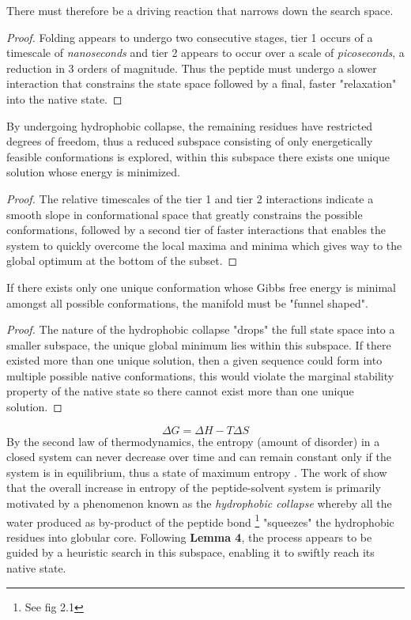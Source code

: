 \begin{lemma}
    There must therefore be a driving reaction that narrows down the search space.
\end{lemma}
\begin{proof}
    Folding appears to undergo two consecutive stages, tier 1
    occurs of a timescale of \emph{nanoseconds} and tier 2 appears
    to occur over a scale of \emph{picoseconds}, a reduction in 3
    orders of magnitude. Thus the peptide must undergo a slower
    interaction that constrains the state space followed by a final, 
    faster "relaxation" into the native state.
\end{proof}
\begin{lemma}
    By undergoing hydrophobic collapse,
    the remaining residues have restricted degrees of freedom,
    thus a reduced subspace consisting of
    only energetically feasible conformations is explored, 
    within this subspace there exists one unique solution whose
    energy is minimized.
\end{lemma}
\begin{proof}
    The relative timescales of the tier 1 and tier 2 interactions indicate
    a smooth slope in conformational space that greatly 
    constrains the possible conformations, followed by a 
    second tier of faster interactions that enables the system to
    quickly overcome the local maxima and minima 
    which gives way to the global optimum at the bottom of the subset.
\end{proof}
\begin{lemma}
    If there exists only one unique conformation whose Gibbs free energy
    is minimal amongst all possible conformations, the manifold must be
    "funnel shaped".
\end{lemma}
\begin{proof}
    The nature of the hydrophobic collapse
    "drops" the full state space into a smaller subspace,
    the unique global minimum lies within this subspace.
    If there existed more than one unique solution, then a given
    sequence could form into multiple possible native conformations, this
    would violate the marginal stability property of the native state
    so there cannot exist more than one unique solution. 
\end{proof}

\[ \Delta G = \Delta H - T \Delta S \]
By the second law of thermodynamics, the entropy (amount of disorder) in a closed system
can never decrease over time and can remain constant only if the
system is in equilibrium, thus a state of maximum entropy \cite{jaffe}.
The work of \cite{Yue,Yang} show that the overall increase in entropy
of the peptide-solvent system is primarily motivated by a phenomenon known as the
\emph{hydrophobic collapse} whereby all the water produced as by-product of the peptide bond
\footnote{See fig 2.1} "squeezes" the hydrophobic residues
into globular core. Following \textbf{Lemma 4}, the process appears
to be guided by a heuristic search in this subspace,
enabling it to swiftly reach its native state.\\

